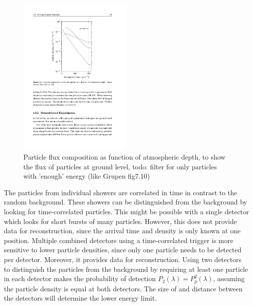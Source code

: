 \begin{figure}
    \centering
    \includegraphics[width=0.5\textwidth]
                    {plots/experiment/particle_density}
    \caption{Particle flux composition as function of atmospheric depth, to show the flux of particles at ground level, todo: filter for only particles with 'enough' energy (like Grupen fig7.10)}
    \label{fig:particle_density}
\end{figure}

The particles from individual showers are correlated in time in contrast to the random background. These showers can be distinguished from the background by looking for time-correlated particles. This might be possible with a single detector which looks for short bursts of many particles. However, this does not provide data for reconstruction, since the arrival time and density is only known at one position. Multiple combined detectors using a time-correlated trigger is more sensitive to lower particle densities, since only one particle needs to be detected per detector. Moreover, it provides data for reconstruction. Using two detectors to distinguish the particles from the background by requiring at least one particle in each detector makes the probability of detection $P_2(\lambda) = P_p^2(\lambda)$, assuming the particle density is equal at both detectors. The size of and distance between the detectors will determine the lower energy limit.

